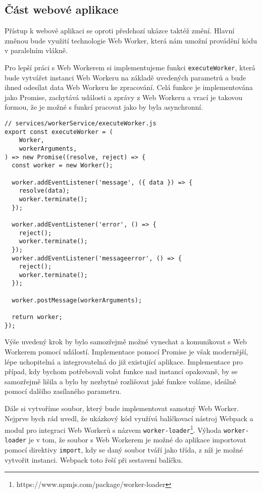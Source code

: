 \documentclass{{template/ctuthesis}}
\begin{document}
\subsection{Část webové aplikace}

Přístup k webové aplikaci se oproti předchozí ukázce taktéž změní. Hlavní změnou bude využití technologie Web Worker, která nám umožní provádění kódu v paralelním vlákně.

Pro lepší práci s Web Workerem si implementujeme funkci \texttt{executeWorker}, která bude vytvářet instanci Web Workeru na základě uvedených parametrů a bude ihned odesílat data Web Workeru ke zpracování. Celá funkce je implementována jako Promise, zachytává události a zprávy z Web Workeru a vrací je takovou formou, že je možné s funkcí pracovat jako by byla asynchronní.

\begin{verbatim}
// services/workerService/executeWorker.js
export const executeWorker = (
    Worker,
    workerArguments,
) => new Promise((resolve, reject) => {
  const worker = new Worker();

  worker.addEventListener('message', ({ data }) => {
    resolve(data);
    worker.terminate();
  });

  worker.addEventListener('error', () => {
    reject();
    worker.terminate();
  });
  worker.addEventListener('messageerror', () => {
    reject();
    worker.terminate();
  });

  worker.postMessage(workerArguments);

  return worker;
});    
\end{verbatim}

Výše uvedený krok by bylo samozřejmě možné vynechat a komunikovat s Web Workerem pomocí událostí. Implementace pomocí Promise je však modernější, lépe uchopitelná a integrovatelná do již existující aplikace. Implementace pro případ, kdy bychom potřebovali volat funkce nad instancí opakovaně, by se samozřejmě lišila a bylo by nezbytné rozlišovat jaké funkce voláme, ideálně pomocí dalšího zasílaného parametru.

Dále si vytvoříme soubor, který bude implementovat samotný Web Worker. Nejprve bych rád uvedl, že ukázkový kód využívá balíčkovací nástroj Webpack a modul pro integraci Web Workerů s názvem \texttt{worker-loader}\footnote{https://www.npmjs.com/package/worker-loader}. Výhoda \texttt{worker-loader} je v tom, že soubor s Web Workerem je možné do aplikace importovat pomocí direktivy \texttt{import}, kdy se daný soubor tváří jako třída, z níž je možné vytvořit instanci. Webpack toto řeší při sestavení balíčku.
\end{document}
